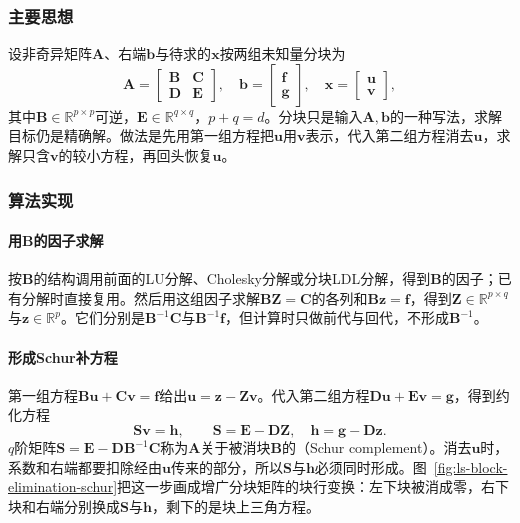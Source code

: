 \subsubsection{主要思想}
设非奇异矩阵$\bm A$、右端$\bm b$与待求的$\bm x$按两组未知量分块为
\[
 \bm A=\begin{bmatrix}\bm B&\bm C\\\bm D&\bm E\end{bmatrix},\quad
 \bm b=\begin{bmatrix}\bm f\\\bm g\end{bmatrix},\quad
 \bm x=\begin{bmatrix}\bm u\\\bm v\end{bmatrix},
\]
其中$\bm B\in\mathbb R^{p\times p}$可逆，$\bm E\in\mathbb R^{q\times q}$，$p+q=d$。分块只是输入$\bm A,\bm b$的一种写法，求解目标仍是精确解。做法是先用第一组方程把$\bm u$用$\bm v$表示，代入第二组方程消去$\bm u$，求解只含$\bm v$的较小方程，再回头恢复$\bm u$。

\subsubsection{算法实现}
\paragraph{用$\bm B$的因子求解}
按$\bm B$的结构调用前面的LU分解、Cholesky分解或分块LDL分解，得到$\bm B$的因子；已有分解时直接复用。然后用这组因子求解$\bm B\bm Z=\bm C$的各列和$\bm B\bm z=\bm f$，得到$\bm Z\in\mathbb R^{p\times q}$与$\bm z\in\mathbb R^p$。它们分别是$\bm B^{-1}\bm C$与$\bm B^{-1}\bm f$，但计算时只做前代与回代，不形成$\bm B^{-1}$。

\paragraph{形成Schur补方程}
第一组方程$\bm B\bm u+\bm C\bm v=\bm f$给出$\bm u=\bm z-\bm Z\bm v$。代入第二组方程$\bm D\bm u+\bm E\bm v=\bm g$，得到约化方程
\begin{equation}
 \bm S\bm v=\bm h,\qquad
 \bm S=\bm E-\bm D\bm Z,\quad
 \bm h=\bm g-\bm D\bm z .
 \label{eq:ls-schur-reduced-system}
\end{equation}
$q$阶矩阵$\bm S=\bm E-\bm D\bm B^{-1}\bm C$称为$\bm A$关于被消块$\bm B$的（Schur complement）。消去$\bm u$时，系数和右端都要扣除经由$\bm u$传来的部分，所以$\bm S$与$\bm h$必须同时形成。图~\ref{fig:ls-block-elimination-schur}把这一步画成增广分块矩阵的块行变换：左下块被消成零，右下块和右端分别换成$\bm S$与$\bm h$，剩下的是块上三角方程。

